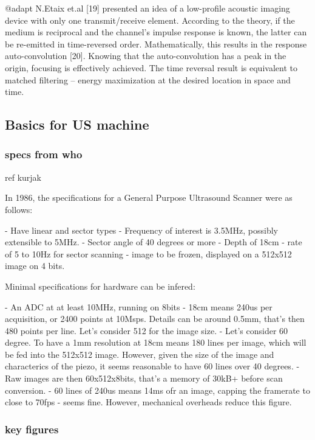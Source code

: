 \documentclass[conference]{IEEEtran}
\begin{document}
@adapt N.Etaix et.al [19] presented an idea of a low-profile acoustic imaging device with only one transmit/receive element. According to the theory, if the medium is reciprocal and the channel’s impulse response is known, the latter can be re-emitted in time-reversed order. Mathematically, this results in the response auto-convolution [20]. Knowing that the auto-convolution has a peak in the origin, focusing is effectively achieved. The time reversal result is equivalent to matched filtering – energy maximization at the desired location in space and time.

\subsection{Basics for US machine}

\subsubsection{specs from who}


ref kurjak

In 1986, the specifications for a General Purpose Ultrasound Scanner were as follows:

- Have linear and sector types
- Frequency of interest is 3.5MHz, possibly extensible to 5MHz.
- Sector angle of 40 degrees or more
- Depth of 18cm
- rate of 5 to 10Hz for sector scanning
- image to be frozen, displayed on a 512x512 image on 4 bits.

Minimal specifications for hardware can be infered:

- An ADC at at least 10MHz, running on 8bits
- 18cm means 240us per acquisition, or 2400 points at 10Msps. Details can be around 0.5mm, that's then  480 points per line. Let's consider 512 for the image size.
- Let's consider 60 degree. To have a 1mm resolution at 18cm means 180 lines per image, which will be fed into the 512x512 image. However, given the size of the image and characterics of the piezo, it seems reasonable to have 60 lines over 40 degrees.
- Raw images are then 60x512x8bits, that's a memory of 30kB+ before scan conversion.
- 60 lines of 240us means 14ms ofr an image, capping the framerate to close to 70fps - seems fine. However, mechanical overheads reduce this figure.



\subsubsection{key figures}
\end{document}
